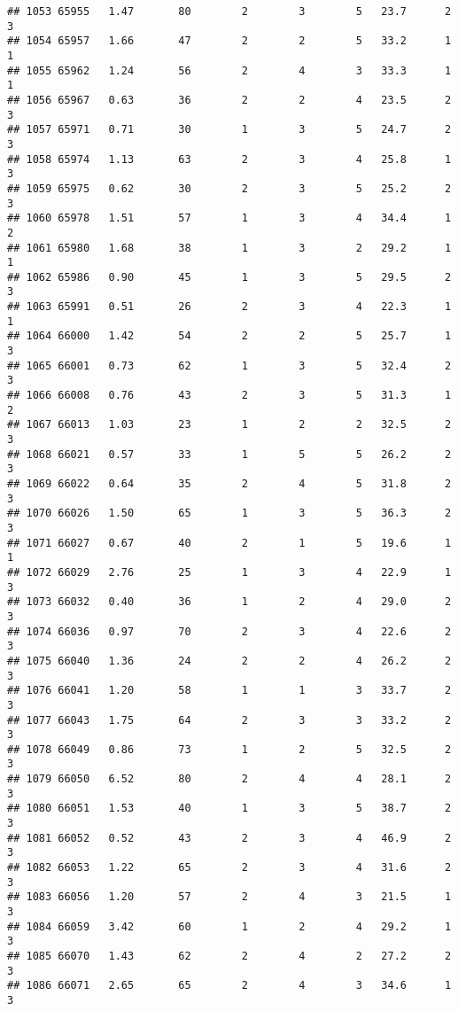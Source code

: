 \documentclass[
]{article}
\begin{document}
\begin{verbatim}
## 1053 65955   1.47       80        2        3        5   23.7      2      3
## 1054 65957   1.66       47        2        2        5   33.2      1      1
## 1055 65962   1.24       56        2        4        3   33.3      1      1
## 1056 65967   0.63       36        2        2        4   23.5      2      3
## 1057 65971   0.71       30        1        3        5   24.7      2      3
## 1058 65974   1.13       63        2        3        4   25.8      1      3
## 1059 65975   0.62       30        2        3        5   25.2      2      3
## 1060 65978   1.51       57        1        3        4   34.4      1      2
## 1061 65980   1.68       38        1        3        2   29.2      1      1
## 1062 65986   0.90       45        1        3        5   29.5      2      3
## 1063 65991   0.51       26        2        3        4   22.3      1      1
## 1064 66000   1.42       54        2        2        5   25.7      1      3
## 1065 66001   0.73       62        1        3        5   32.4      2      3
## 1066 66008   0.76       43        2        3        5   31.3      1      2
## 1067 66013   1.03       23        1        2        2   32.5      2      3
## 1068 66021   0.57       33        1        5        5   26.2      2      3
## 1069 66022   0.64       35        2        4        5   31.8      2      3
## 1070 66026   1.50       65        1        3        5   36.3      2      3
## 1071 66027   0.67       40        2        1        5   19.6      1      1
## 1072 66029   2.76       25        1        3        4   22.9      1      3
## 1073 66032   0.40       36        1        2        4   29.0      2      3
## 1074 66036   0.97       70        2        3        4   22.6      2      3
## 1075 66040   1.36       24        2        2        4   26.2      2      3
## 1076 66041   1.20       58        1        1        3   33.7      2      3
## 1077 66043   1.75       64        2        3        3   33.2      2      3
## 1078 66049   0.86       73        1        2        5   32.5      2      3
## 1079 66050   6.52       80        2        4        4   28.1      2      3
## 1080 66051   1.53       40        1        3        5   38.7      2      3
## 1081 66052   0.52       43        2        3        4   46.9      2      3
## 1082 66053   1.22       65        2        3        4   31.6      2      3
## 1083 66056   1.20       57        2        4        3   21.5      1      3
## 1084 66059   3.42       60        1        2        4   29.2      1      3
## 1085 66070   1.43       62        2        4        2   27.2      2      3
## 1086 66071   2.65       65        2        4        3   34.6      1      3

\end{verbatim}
\end{document}
